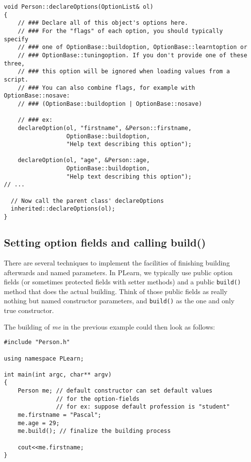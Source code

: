 \documentclass[11pt]{book}
\begin{document}
\begin{verbatim}
void Person::declareOptions(OptionList& ol) 
{
    // ### Declare all of this object's options here.
    // ### For the "flags" of each option, you should typically specify
    // ### one of OptionBase::buildoption, OptionBase::learntoption or
    // ### OptionBase::tuningoption. If you don't provide one of these three,
    // ### this option will be ignored when loading values from a script.
    // ### You can also combine flags, for example with OptionBase::nosave:
    // ### (OptionBase::buildoption | OptionBase::nosave)

    // ### ex:
    declareOption(ol, "firstname", &Person::firstname,
                  OptionBase::buildoption,
                  "Help text describing this option");

    declareOption(ol, "age", &Person::age,
                  OptionBase::buildoption,
                  "Help text describing this option");
// ...

  // Now call the parent class' declareOptions
  inherited::declareOptions(ol);
}
\end{verbatim}

\subsection{Setting option fields and calling build()}

There are several techniques to implement the facilities of finishing
building afterwards and named parameters.  In PLearn, we typically
use public option fields (or sometimes protected fields with setter
methods) and a public {\tt build()} method that does the actual
building. Think of those public fields as really nothing but named
constructor parameters, and {\tt build()} as the one and only true
constructor.

The building of {\em me} in the previous example could then look
as follows:

\begin{verbatim}
#include "Person.h"

using namespace PLearn;

int main(int argc, char** argv)
{
    Person me; // default constructor can set default values 
               // for the option-fields
               // for ex: suppose default profession is "student"
    me.firstname = "Pascal";
    me.age = 29;
    me.build(); // finalize the building process

    cout<<me.firstname; 
}
\end{verbatim}
\end{document}
